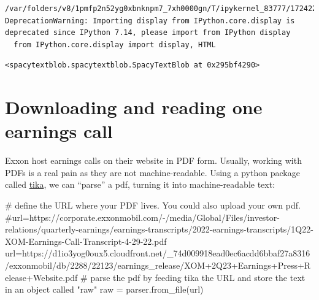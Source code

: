 \documentclass[
  letterpaper,
  DIV=11,
  numbers=noendperiod]{scrreprt}
\newenvironment{Shaded}{\begin{snugshade}}{\end{snugshade}}
\newcommand{\CommentTok}[1]{\textcolor[rgb]{0.37,0.37,0.37}{#1}}
\newcommand{\NormalTok}[1]{\textcolor[rgb]{0.00,0.23,0.31}{#1}}
\newcommand{\OperatorTok}[1]{\textcolor[rgb]{0.37,0.37,0.37}{#1}}
\newcommand{\StringTok}[1]{\textcolor[rgb]{0.13,0.47,0.30}{#1}}
\begin{document}
\begin{verbatim}
/var/folders/v8/1pmfp2n52yg0xbnknpm7_7xh0000gn/T/ipykernel_83777/1724223035.py:4: DeprecationWarning: Importing display from IPython.core.display is deprecated since IPython 7.14, please import from IPython display
  from IPython.core.display import display, HTML
\end{verbatim}

\begin{verbatim}
<spacytextblob.spacytextblob.SpacyTextBlob at 0x295bf4290>
\end{verbatim}

\hypertarget{downloading-and-reading-one-earnings-call}{%
\section{Downloading and reading one earnings
call}\label{downloading-and-reading-one-earnings-call}}

Exxon host earnings calls on their website in PDF form. Usually, working
with PDFs is a real pain as they are not machine-readable. Using a
python package called
\href{https://www.geeksforgeeks.org/parsing-pdfs-in-python-with-tika/}{tika},
we can ``parse'' a pdf, turning it into machine-readable text:

\begin{Shaded}
\begin{Highlighting}[]
\CommentTok{\# define the URL where your PDF lives. You could also upload your own pdf.}
\CommentTok{\#url=\textquotesingle{}https://corporate.exxonmobil.com/{-}/media/Global/Files/investor{-}relations/quarterly{-}earnings/earnings{-}transcripts/2022{-}earnings{-}transcripts/1Q22{-}XOM{-}Earnings{-}Call{-}Transcript{-}4{-}29{-}22.pdf\textquotesingle{}}
\NormalTok{url}\OperatorTok{=}\StringTok{\textquotesingle{}https://d1io3yog0oux5.cloudfront.net/\_74d009918ead0ec6acdd6bbaf27a8316/exxonmobil/db/2288/22123/earnings\_release/XOM+2Q23+Earnings+Press+Release+Website.pdf\textquotesingle{}}
\CommentTok{\# parse the pdf by feeding tika the URL and store the text in an object called "raw" }
\NormalTok{raw }\OperatorTok{=}\NormalTok{ parser.from\_file(url)}
\end{Highlighting}
\end{Shaded}
\end{document}
